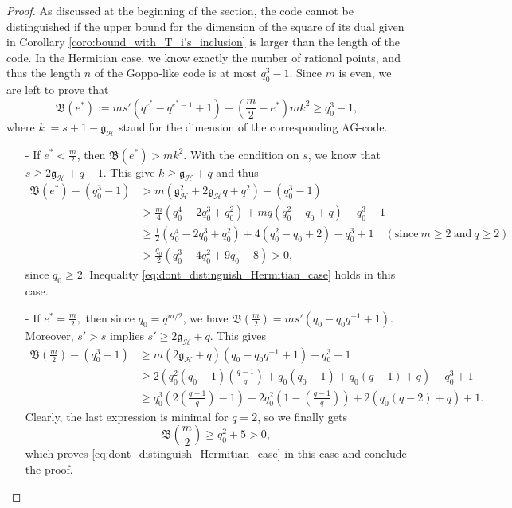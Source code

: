 \documentclass[a4paper]{article}
\theoremstyle{definition}
\theoremstyle{remark}
\newcommand{\calH}{\mathcal{H}}
\begin{document}
\begin{proof}
    As discussed at the beginning of the section, the code cannot be distinguished if the upper bound for the dimension of the square of its dual given in Corollary \ref{coro:bound_with_T_i's_inclusion} is larger than the length of the code. In the Hermitian case, we know exactly the number of rational points, and thus the length $n$ of the Goppa-like code is at most $q_0^3-1$. Since $m$ is even, we are left to prove that 
    \begin{equation} \label{eq:dont_distinguish_Hermitian_case}
    \mathfrak{B}(e^*) := ms'(q^{e^*}-q^{e^*-1}+1) + \left( \frac{m}{2}-e^*\right)mk^2 \geq q_0^3-1,
    \end{equation}
    where $k := s+1-\mathfrak{g}_{\calH}$ stand for the dimension of the corresponding AG-code.
    \begin{itemize}
        \item [-] If $e^* < \frac{m}{2}$, then $\mathfrak{B}(e^*) > mk^2$. With the condition on $s$, we know that $s \geq 2\mathfrak{g}_{\calH}+q-1$. This give $k \geq \mathfrak{g}_{\calH}+q$ and thus
        \begin{align*}
\mathfrak{B}(e^*) - (q_0^3-1) 
&> m(\mathfrak{g}_{\calH}^2+2\mathfrak{g}_{\calH}q+q^2)-(q_0^3-1)\\
& > \frac{m}{4}(q_0^4-2q_0^3+q_0^2) + mq(q_0^2-q_0+q) -q_0^3+1 \\
& \geq \frac{1}{2}(q_0^4-2q_0^3+q_0^2)+4(q_0^2-q_0+2)-q_0^3+1 \quad (\mathrm{since} \ m\geq 2 \ \mathrm{and} \ q\geq 2)\\
& > \frac{q_0}{2} (q_0^3-4q_0^2+9q_0-8) > 0,
        \end{align*}
        since $q_0 \geq 2$. Inequality \eqref{eq:dont_distinguish_Hermitian_case} holds in this case.
        \item[-] If $e^* = \frac{m}{2},$ then since $q_0=q^{m/2}$, we have $\mathfrak{B}\left(\frac{m}{2}\right) = ms'(q_0-q_0q^{-1}+1)$. Moreover, $s'>s$ implies $s' \geq 2\mathfrak{g}_{\calH}+q$. This gives
        \begin{align*}
           \mathfrak{B}\left(\frac{m}{2}\right) - (q_0^3-1) 
           &\geq m(2\mathfrak{g}_{\calH}+q)(q_0-q_0q^{-1}+1)-q_0^3+1 \\ 
           &\geq 2\left(q_0^2(q_0-1)\left(\frac{q-1}{q}\right)+q_0(q_0-1)+q_0(q-1)+q\right)-q_0^3+1 \\
           & \geq q_0^3\left(2\left(\frac{q-1}{q}\right)-1\right) + 2q_0^2\left(1-\left(\frac{q-1}{q}\right)\right) + 2(q_0(q-2)+q)+1.
        \end{align*}
        Clearly, the last expression is minimal for $q=2$, so we finally gets
        $$\mathfrak{B}\left(\frac{m}{2}\right) \geq q_0^2 + 5 >0,$$
        which proves \eqref{eq:dont_distinguish_Hermitian_case} in this case and conclude the proof.
    \end{itemize}
\end{proof}
\end{document}
